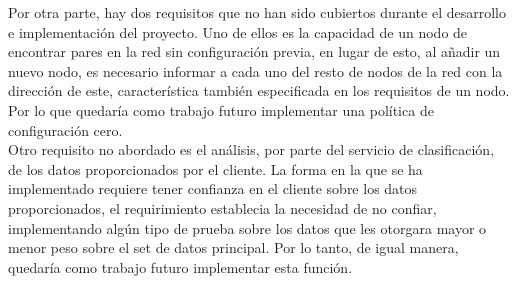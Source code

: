 \documentclass[11pt]{article}
\begin{document}
			Por otra parte, hay dos requisitos que no han sido cubiertos durante el desarrollo e implementación del proyecto. Uno de ellos es la capacidad de un nodo de encontrar pares en la red sin 
			configuración previa, en lugar de esto, al añadir un nuevo nodo, es necesario informar a cada uno del resto de nodos de la red con la dirección de este, característica también especificada en 
			los requisitos de un nodo. Por lo que quedaría como trabajo futuro implementar una política de configuración cero. \\
			Otro requisito no abordado es el análisis, por parte del servicio de clasificación, de los datos proporcionados por el cliente. La forma en la que se ha implementado requiere tener 
			confianza en el cliente sobre los datos proporcionados, el requirimiento establecia la necesidad de no confiar, implementando algún tipo de prueba sobre los datos que les otorgara mayor o menor 
			peso sobre el set de datos principal. Por lo tanto, de igual manera, quedaría como trabajo futuro implementar esta función. \\ \\
\end{document}
